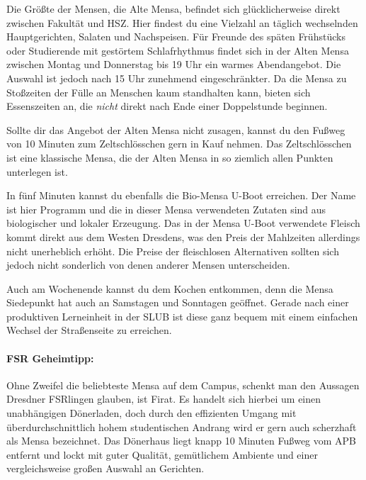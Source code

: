 Die Größte der Mensen, die Alte Mensa, befindet sich glücklicherweise direkt zwischen Fakultät und HSZ\@.
Hier findest du eine Vielzahl an täglich wechselnden Hauptgerichten, Salaten und Nachspeisen.
Für Freunde des späten Frühstücks oder Studierende mit gestörtem Schlafrhythmus findet sich in der Alten Mensa zwischen Montag und Donnerstag bis 19 Uhr ein warmes Abendangebot.
Die Auswahl ist jedoch nach 15 Uhr zunehmend eingeschränkter.
Da die Mensa zu Stoßzeiten der Fülle an Menschen kaum standhalten kann, bieten sich Essenszeiten an, die \emph{nicht} direkt nach Ende einer Doppelstunde beginnen.

Sollte dir das Angebot der Alten Mensa nicht zusagen, kannst du den Fußweg von 10 Minuten zum Zeltschlösschen gern in Kauf nehmen. Das Zeltschlösschen ist eine klassische Mensa, die der Alten Mensa in so ziemlich allen Punkten unterlegen ist.

In fünf Minuten kannst du ebenfalls die Bio-Mensa U-Boot erreichen. Der Name ist hier Programm und die in dieser Mensa verwendeten Zutaten sind aus biologischer und lokaler Erzeugung.
Das in der Mensa U-Boot verwendete Fleisch kommt direkt aus dem Westen Dresdens, was den Preis der Mahlzeiten allerdings nicht unerheblich erhöht.
Die Preise der fleischlosen Alternativen sollten sich jedoch nicht sonderlich von denen anderer Mensen unterscheiden.

Auch am Wochenende kannst du dem Kochen entkommen, denn die Mensa Siedepunkt hat auch an Samstagen und Sonntagen geöffnet.
Gerade nach einer produktiven Lerneinheit in der SLUB ist diese ganz bequem mit einem einfachen Wechsel der Straßenseite zu erreichen.

\paragraph{FSR Geheimtipp:}
Ohne Zweifel die beliebteste Mensa auf dem Campus, schenkt man den Aussagen Dresdner FSRlingen glauben, ist Firat.
Es handelt sich hierbei um einen unabhängigen Dönerladen, doch durch den effizienten Umgang mit überdurchschnittlich hohem studentischen Andrang wird er gern auch scherzhaft als Mensa bezeichnet.
Das Dönerhaus liegt knapp 10 Minuten Fußweg vom APB entfernt und lockt mit guter Qualität, gemütlichem Ambiente und einer vergleichsweise großen Auswahl an Gerichten.


